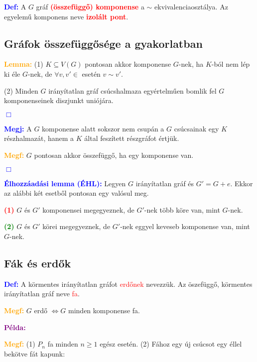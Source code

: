 \documentclass[12pt]{article}
\begin{document}
			\textcolor{blue}{\textbf{Def:}} A $G$ gráf \textcolor{red}{\textbf{(összefüggő) komponense}} a $\sim$ ekvivalenciaosztálya. Az egyelemű komponens neve \textcolor{red}{\textbf{izolált pont}}.

		\subsection{Gráfok összefüggősége a gyakorlatban}

			\textcolor{orange}{\textbf{Lemma:}} (1) $K \subseteq V(G)$ pontosan akkor komponense $G$-nek, ha $K$-ból nem lép ki éle $G$-nek, de $\forall v,v' \in$ esetén $v \sim v'$.

			(2) Minden $G$ irányítatlan gráf csúcshalmaza egyértelműen bomlik fel $G$ komponenseinek diszjunkt uniójára. \raggedright \textcolor{blue}{$\Box$} 

			\textcolor{blue}{\textbf{Megj:}} A $G$ komponense alatt sokszor nem csupán a $G$ csúcsainak egy $K$ részhalmazát, hanem a $K$ által feszített részgráfot értjük.

			\textcolor{orange}{\textbf{Megf:}} $G$ pontosan akkor összefüggő, ha egy komponense van. \raggedright \textcolor{blue}{$\Box$} 

			\textcolor{blue}{\textbf{Élhozzáadási lemma (ÉHL):}} Legyen $G$ irányítatlan gráf és $G' = G + e$. Ekkor az alábbi két esetből pontosan egy valósul meg.

			\textcolor{red}{\textbf{(1)}} $G$ és $G'$ komponensei megegyeznek, de $G'$-nek több köre van, mint $G$-nek.

			\textcolor{green}{\textbf{(2)}} $G$ és $G'$ körei megegyeznek, de $G'$-nek eggyel keveseb komponense van, mint $G$-nek.

		\subsection{Fák és erdők}

			\textcolor{blue}{\textbf{Def:}} A körmentes irányítatlan gráfot \textcolor{red}{erdőnek} nevezzük. Az öszefüggő, körmentes irányítatlan gráf neve \textcolor{red}{fa}.

			\textcolor{orange}{\textbf{Megf:}} $G$ erdő $\Longleftrightarrow  G$ minden komponense fa.

			\textcolor{purple}{\textbf{Példa:}}

			\textcolor{orange}{\textbf{Megf:}} (1) $P_n$ fa minden $n \geq 1$ egész esetén. (2) Fához egy új csúcsot egy éllel bekötve fát kapunk:
\end{document}
